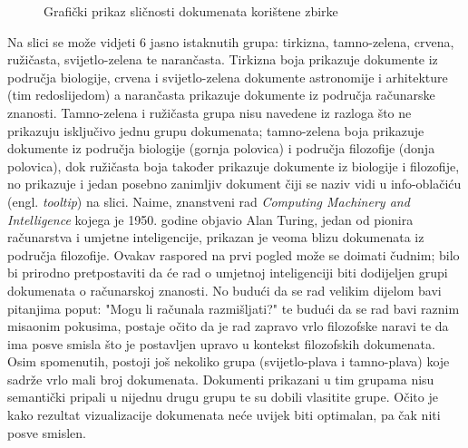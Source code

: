 \documentclass[times, utf8, zavrsni, numeric]{fer}
\begin{document}
\begin{figure}
\caption{Grafički prikaz sličnosti dokumenata korištene zbirke}
\label{img:turing}
\end{figure}

Na slici se može vidjeti 6 jasno istaknutih grupa: tirkizna, tamno-zelena, crvena, ružičasta, svijetlo-zelena te narančasta. Tirkizna boja prikazuje dokumente iz područja biologije, crvena i svijetlo-zelena dokumente astronomije i arhitekture (tim redoslijedom) a narančasta prikazuje dokumente iz područja računarske znanosti. Tamno-zelena i ružičasta grupa nisu navedene iz razloga što ne prikazuju isključivo jednu grupu dokumenata; tamno-zelena boja prikazuje dokumente iz područja biologije (gornja polovica) i područja filozofije (donja polovica), dok ružičasta boja također prikazuje dokumente iz biologije i filozofije, no prikazuje i jedan posebno zanimljiv dokument čiji se naziv vidi u info-oblačiću (engl. \textit{tooltip}) na slici. Naime, znanstveni rad \textit{Computing Machinery and Intelligence} kojega je 1950. godine objavio Alan Turing, jedan od pionira računarstva i umjetne inteligencije, prikazan je veoma blizu dokumenata iz područja filozofije. Ovakav raspored na prvi pogled može se doimati čudnim; bilo bi prirodno pretpostaviti da će rad o umjetnoj inteligenciji biti dodijeljen grupi dokumenata o računarskoj znanosti. No budući da se rad velikim dijelom bavi pitanjima poput: "Mogu li računala razmišljati?" te budući da se rad bavi raznim misaonim pokusima, postaje očito da je rad zapravo vrlo filozofske naravi te da ima posve smisla što je postavljen upravo u kontekst filozofskih dokumenata. Osim spomenutih, postoji još nekoliko grupa (svijetlo-plava i tamno-plava) koje sadrže vrlo mali broj dokumenata. Dokumenti prikazani u tim grupama nisu semantički pripali u nijednu drugu grupu te su dobili vlasitite grupe. Očito je kako rezultat vizualizacije dokumenata neće uvijek biti optimalan, pa čak niti posve smislen.
\end{document}
